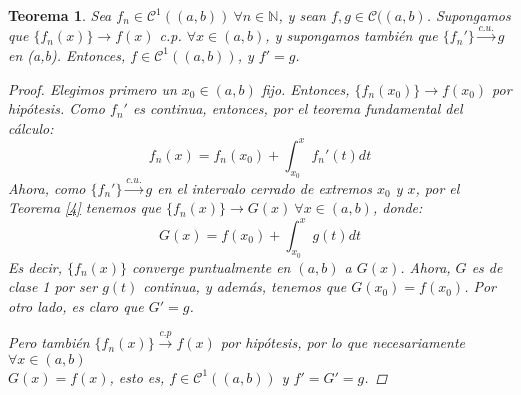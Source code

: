 \documentclass[11pt, a4paper]{article}
\theoremstyle{theorem-style}
\newtheorem{nth}{Teorema}[section]
\theoremstyle{definition-style}
\theoremstyle{remark-style}
\theoremstyle{example-style}
\begin{document}
\begin{nth} \label{5}
  Sea $f_n\in \mathcal{C}^1((a,b)) \ \forall n \in \mathbb{N}$, y sean $f,g \in \mathcal{C}((a,b)$. Supongamos que $ \{f_n(x)\} \to f(x)$ c.p. $\forall x \in (a,b)$, y supongamos también que $\{f_n'\} \xrightarrow{c.u.} g $ en (a,b). Entonces, $f \in \mathcal{C}^1((a,b))$, y $f' = g$.
  
  \begin{proof}
    Elegimos primero un $x_0 \in (a,b)$ fijo. Entonces, $\{f_n(x_0)\} \to f(x_0)$ por hipótesis.
    Como $f_n'$ es continua, entonces, por el teorema fundamental del cálculo:
    \[
      f_n(x) = f_n(x_0) + \int_{x_0}^x f_n'(t)dt
    \]
    Ahora, como  $\{f_n'\} \xrightarrow{c.u.} g $ en el intervalo cerrado de extremos $x_0$ y $x$, por el \textit{Teorema \ref{4}} tenemos que $\{f_n(x)\} \to G(x)\ \forall x \in (a,b)$, donde:
    \[
      G(x) = f(x_0) + \int_{x_0}^x g(t)dt
    \]
    Es decir, $\{f_n(x)\}$ converge puntualmente en $(a,b)$ a $G(x)$. Ahora, $G$ es de clase 1 por ser $g(t)$ continua, y además, tenemos que $G(x_0) = f(x_0)$.
    Por otro lado, es claro que $G' = g$.
    
    Pero también $\{f_n(x)\} \xrightarrow {c.p} f(x)$ por hipótesis, por lo que necesariamente $\forall x \in (a,b)$ \\ $G(x) = f(x)$, esto es, $f \in \mathcal{C}^1((a,b))$ y $f' = G' = g$.
  \end{proof}
\end{nth}
\end{document}
